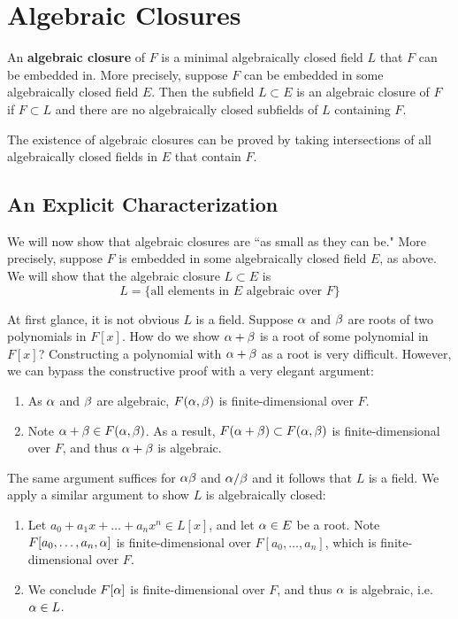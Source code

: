 \section{Algebraic Closures}
An \textbf{algebraic closure} of $F$ is a minimal algebraically closed field $L$ that $F$ can be embedded in. More precisely, suppose $F$ can be embedded in some algebraically closed field $E$. Then the subfield $L \subset E$ is an algebraic closure of $F$ if $F \subset L$ and there are no algebraically closed subfields of $L$ containing $F$.

The existence of algebraic closures can be proved by taking intersections of all algebraically closed fields in $E$ that contain $F$.

\subsection{An Explicit Characterization}
We will now show that algebraic closures are ``as small as they can be." More precisely, suppose $F$ is embedded in some algebraically closed field $E$, as above. We will show that the algebraic closure $L \subset E$ is
\[
    L = \{\text{all elements in $E$ algebraic over $F$}\}
\]

At first glance, it is not obvious $L$ is a field. Suppose $\alpha$ and $\beta$ are roots of two polynomials in $F[x]$. How do we show $\alpha + \beta$ is a root of some polynomial in $F[x]$? Constructing a polynomial with $\alpha + \beta$ as a root is very difficult. However, we can bypass the constructive proof with a very elegant argument:
\begin{enumerate}
    \item As $\alpha$ and $\beta$ are algebraic, $F(\alpha, \beta)$ is finite-dimensional over $F$.
    \item Note $\alpha + \beta \in F(\alpha, \beta)$. As a result, $F(\alpha + \beta) \subset F(\alpha, \beta)$ is finite-dimensional over $F$, and thus $\alpha + \beta$ is algebraic.
\end{enumerate}
The same argument suffices for $\alpha\beta$ and $\alpha/\beta$ and it follows that $L$ is a field. We apply a similar argument to show $L$ is algebraically closed:
\begin{enumerate}
    \item Let $a_0 + a_1x + \dots + a_nx^n \in L[x]$, and let $\alpha \in E$ be a root. Note $F[a_0, \dots, a_n, \alpha]$ is finite-dimensional over $F[a_0, \dots, a_n]$, which is finite-dimensional over $F$.
    \item We conclude $F[\alpha]$ is finite-dimensional over $F$, and thus $\alpha$ is algebraic, i.e. $\alpha \in L$.
\end{enumerate}

